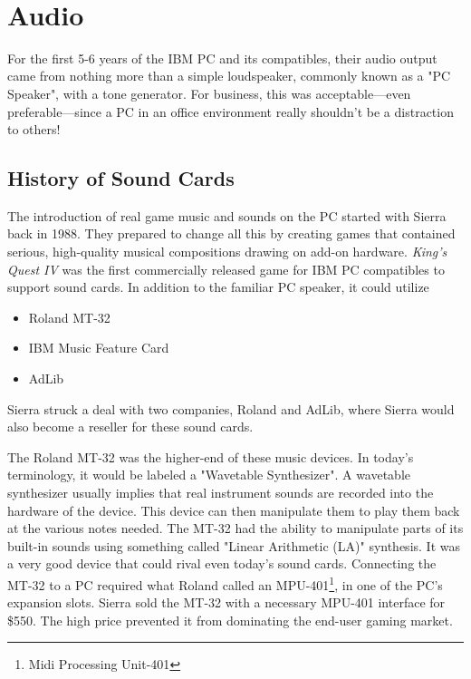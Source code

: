 \documentclass[book.tex]{subfiles}
\begin{document}
\\


\section{Audio}
\label{hardware-audio}
For the first 5-6 years of the IBM PC and its compatibles, their audio output came from nothing more than a simple loudspeaker, commonly known as a "PC Speaker", with a tone generator. For business, this was acceptable---even preferable---since a PC in an office environment really shouldn't be a distraction to others!\\
\begin{figure}[H]
\centering
{}
\end{figure}


\subsection{History of Sound Cards}
The introduction of real game music and sounds on the PC started with Sierra back in 1988. They prepared to change all this by creating games that contained serious, high-quality musical compositions drawing on add-on hardware. \textit{King's Quest IV} was the first commercially released game for IBM PC compatibles to support sound cards. In addition to the familiar PC speaker, it could utilize 
\begin{itemize}
    \item Roland MT-32
    \item IBM Music Feature Card
    \item AdLib
\end{itemize}
 
Sierra struck a deal with two companies, Roland and AdLib, where Sierra would also become a reseller for these sound cards. \\

\par
The Roland MT-32 was the higher-end of these music devices. In today's terminology, it would be labeled a "Wavetable Synthesizer". A wavetable synthesizer usually implies that real instrument sounds are recorded into the hardware of the device. This device can then manipulate them to play them back at the various notes needed. The MT-32 had the ability to manipulate parts of its built-in sounds using something called "Linear Arithmetic (LA)" synthesis. It was a very good device that could rival even today's sound cards. Connecting the MT-32 to a PC required what Roland called an MPU-401\footnote{Midi Processing Unit-401}, in one of the PC's expansion slots. Sierra sold the MT-32 with a necessary MPU-401 interface for \$550. The high price prevented it from dominating the end-user gaming market.\\
\end{document}
